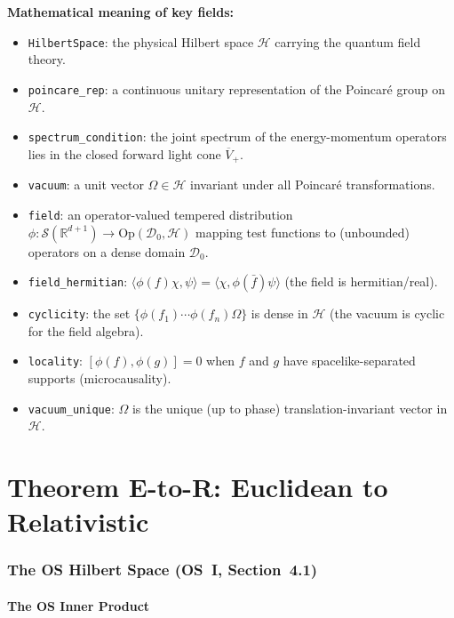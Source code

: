 \documentclass[11pt,a4paper]{article}
\newcommand{\Schwartz}{\mathscr{S}}
\begin{document}
\noindent\textbf{Mathematical meaning of key fields:}
\begin{itemize}
\item \texttt{HilbertSpace}: the physical Hilbert space $\mathscr{H}$ carrying
  the quantum field theory.
\item \texttt{poincare\_rep}: a continuous unitary representation of the
  Poincar\'e group on $\mathscr{H}$.
\item \texttt{spectrum\_condition}: the joint spectrum of the energy-momentum
  operators lies in the closed forward light cone $\overline{V}_+$.
\item \texttt{vacuum}: a unit vector $\Omega \in \mathscr{H}$ invariant under
  all Poincar\'e transformations.
\item \texttt{field}: an operator-valued tempered distribution
  $\phi : \Schwartz(\mathbb{R}^{d+1}) \to \mathrm{Op}(\mathscr{D}_0, \mathscr{H})$
  mapping test functions to (unbounded) operators on a dense domain $\mathscr{D}_0$.
\item \texttt{field\_hermitian}: $\langle \phi(f)\chi, \psi \rangle =
  \langle \chi, \phi(\bar{f})\psi \rangle$ (the field is hermitian/real).
\item \texttt{cyclicity}: the set $\{\phi(f_1)\cdots\phi(f_n)\Omega\}$ is
  dense in $\mathscr{H}$ (the vacuum is cyclic for the field algebra).
\item \texttt{locality}: $[\phi(f), \phi(g)] = 0$ when $f$ and $g$ have
  spacelike-separated supports (microcausality).
\item \texttt{vacuum\_unique}: $\Omega$ is the unique (up to phase)
  translation-invariant vector in $\mathscr{H}$.
\end{itemize}


\part{Theorem E-to-R: Euclidean to Relativistic}

\section{The OS Hilbert Space (OS~I, Section~4.1)}

\subsection{The OS Inner Product}
\end{document}
